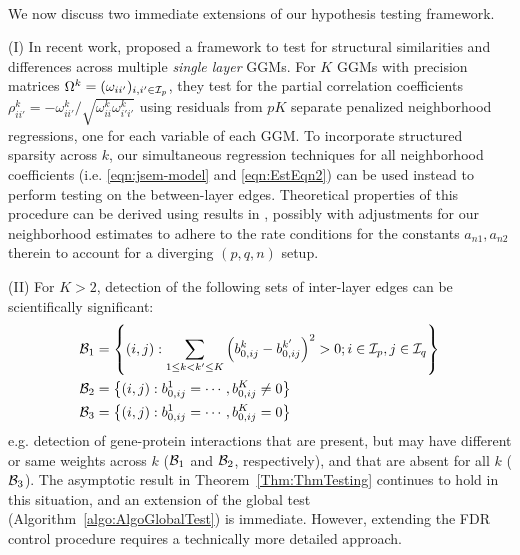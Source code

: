 \paragraph{}
We now discuss two immediate extensions of our hypothesis testing framework.

\vspace{1em}
\noindent (I) In recent work, \cite{Liu17} proposed a framework to test for structural similarities and differences across multiple {\it single layer} GGMs. For $K$ GGMs with precision matrices $\Omega^k = (\omega_{ii'})_{i,i' \in {\cal{I}}_p}$, they test for the partial correlation coefficients $\rho_{ii'}^{k} = - \omega_{ii'}^{k} / \sqrt{\omega_{ii}^{k} \omega_{i'i'}^{k}}$ using residuals from $pK$ separate penalized neighborhood regressions, one for each variable of each GGM. To incorporate structured sparsity across $k$, our simultaneous regression techniques for all neighborhood coefficients (i.e. \eqref{eqn:jsem-model} and \eqref{eqn:EstEqn2}) can be used instead to perform testing on the between-layer edges. Theoretical properties of this procedure can be derived using results in \cite{Liu17}, possibly with adjustments for our neighborhood estimates to adhere to the rate conditions for the constants $a_{n1}, a_{n2}$ therein to account for a diverging $(p,q,n)$ setup.

\noindent (II) For $K > 2$, detection of the following sets of inter-layer edges can be scientifically significant:
%
\begin{align*}
{\cal{B}}_1 &= \left\{ (i,j): \sum_{1 \leq k < k' \leq K} \left(b_{0,ij}^k - b_{0,ij}^{k'} \right)^2 > 0; i \in {\cal{I}}_p, j \in {\cal{I}}_q \right\}\\
{\cal{B}}_2 &= \left\{ (i,j): b_{0,ij}^1 = \cdots, b_{0,ij}^K \neq 0 \right\}\\
{\cal{B}}_3 &= \left\{ (i,j): b_{0,ij}^1 = \cdots, b_{0,ij}^K = 0 \right\}
\end{align*}
%
e.g. detection of gene-protein interactions that are present, but may have different or same weights across $k$ (${\cal{B}}_1$ and ${\cal{B}}_2$, respectively), and that are absent for all $k$ (${\cal{B}}_3$). The asymptotic result in Theorem~\ref{Thm:ThmTesting} continues to hold in this situation, and an extension of the global test (Algorithm~\ref{algo:AlgoGlobalTest}) is immediate. However, extending the FDR control procedure requires a technically more detailed approach.

